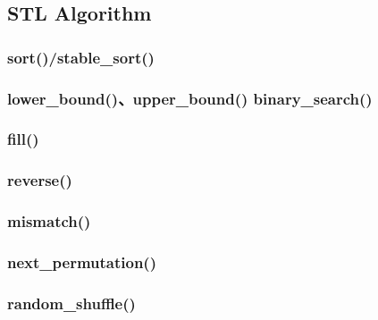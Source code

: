\documentclass{article}
\begin{document}
\subsection{STL Algorithm}
\subsubsection{sort()/stable\_sort()}

\subsubsection{lower\_bound()、upper\_bound() binary\_search()}

\subsubsection{fill()}

\subsubsection{reverse()}

\subsubsection{mismatch()}

\subsubsection{next\_permutation()}

\subsubsection{random\_shuffle()}
\end{document}
